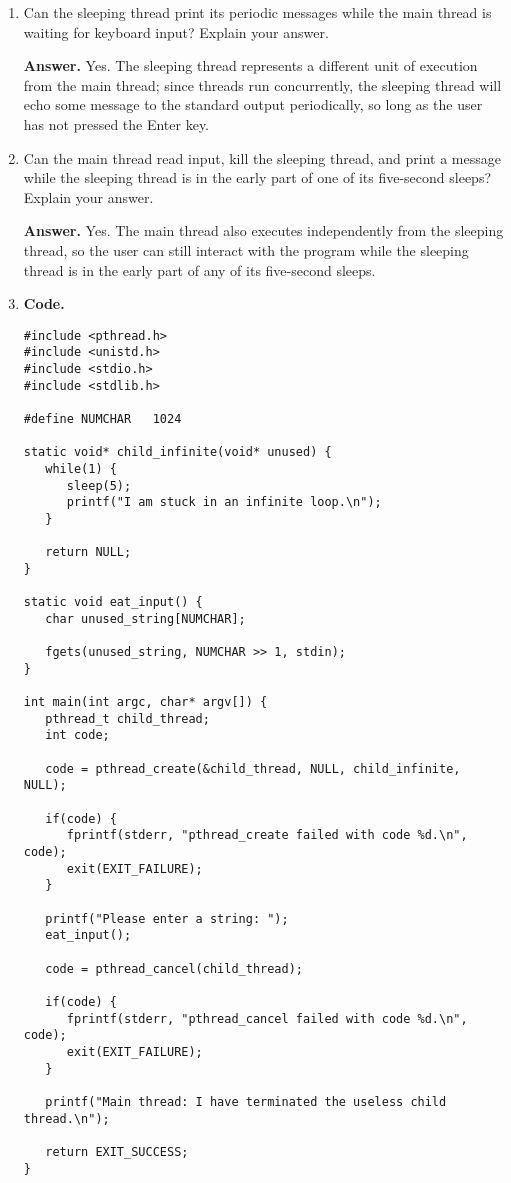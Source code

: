 \documentclass[9pt]{article}
\begin{document}
\begin{enumerate}
   \item Can the sleeping thread print its periodic messages while the main
         thread is waiting for keyboard input? Explain your answer.
         
      \textbf{Answer.} Yes. The sleeping thread represents a different unit of
      execution from the main thread; since threads run concurrently, the
      sleeping thread will echo some message to the standard output
      periodically, so long as the user has not pressed the Enter key.
   \item Can the main thread read input, kill the sleeping thread, and print a
         message while the sleeping thread is in the early part of one of its
         five-second sleeps? Explain your answer.
   
      \textbf{Answer.} Yes. The main thread also executes independently from the
      sleeping thread, so the user can still interact with the program while the
      sleeping thread is in the early part of any of its five-second sleeps.
   \item \textbf{Code.}
   
         \begin{verbatim}
#include <pthread.h>
#include <unistd.h>
#include <stdio.h>
#include <stdlib.h>

#define NUMCHAR   1024

static void* child_infinite(void* unused) {
   while(1) {
      sleep(5);
      printf("I am stuck in an infinite loop.\n");
   }

   return NULL;
}

static void eat_input() {
   char unused_string[NUMCHAR];

   fgets(unused_string, NUMCHAR >> 1, stdin);
}

int main(int argc, char* argv[]) {
   pthread_t child_thread;
   int code;

   code = pthread_create(&child_thread, NULL, child_infinite, NULL);

   if(code) {
      fprintf(stderr, "pthread_create failed with code %d.\n", code);
      exit(EXIT_FAILURE);
   }

   printf("Please enter a string: ");
   eat_input();

   code = pthread_cancel(child_thread);

   if(code) {
      fprintf(stderr, "pthread_cancel failed with code %d.\n", code);
      exit(EXIT_FAILURE);
   }

   printf("Main thread: I have terminated the useless child thread.\n");

   return EXIT_SUCCESS;
}
         \end{verbatim}
\end{enumerate}
\end{document}
